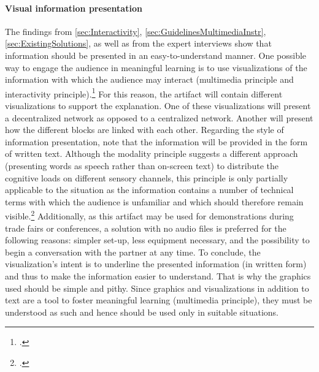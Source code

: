 
\paragraph{Visual information presentation} The findings from \ref{sec:Interactivity}, \ref{sec:GuidelinesMultimediaInstr}, \ref{sec:ExistingSolutions}, as well as from the expert interviews show that information should be presented in an easy-to-understand manner. One possible way to engage the audience in meaningful learning is to use visualizations of the information with which the audience may interact (multimedia principle and interactivity principle).\footcites[Cf.][]{RalphBeckmann_Interview}[cf.][p.1025]{DomagkInteractivitymultimedialearning2010}[cf.][p.311]{MorenoInteractiveMultimodalLearning2007}[cf.][p.290]{Betrancourtanimationinteractivityprinciples2005} For this reason, the artifact will contain different visualizations to support the explanation. One of these visualizations will present a decentralized network as opposed to a centralized network. Another will present how the different blocks are linked with each other. Regarding the style of information presentation, note that the information will be provided in the form of written text. Although the modality principle suggests a different approach (presenting words as speech rather than on-screen text) to distribute the cognitive loads on different sensory channels, this principle is only partially applicable to the situation as the information contains a number of technical terms with which the audience is unfamiliar and which should therefore remain visible.\footcite[Cf.][chapter 6, paragraph 1]{ClarkElearningscienceinstruction2016} Additionally, as this artifact may be used for demonstrations during trade fairs or conferences, a solution with no audio files is preferred for the following reasons: simpler set-up, less equipment necessary, and the possibility to begin a conversation with the partner at any time. To conclude, the visualization's intent is to underline the presented information (in written form) and thus to make the information easier to understand. That is why the graphics used should be simple and pithy. Since graphics and visualizations in addition to text are a tool to foster meaningful learning (multimedia principle), they must be understood as such and hence should be used only in suitable situations. 

